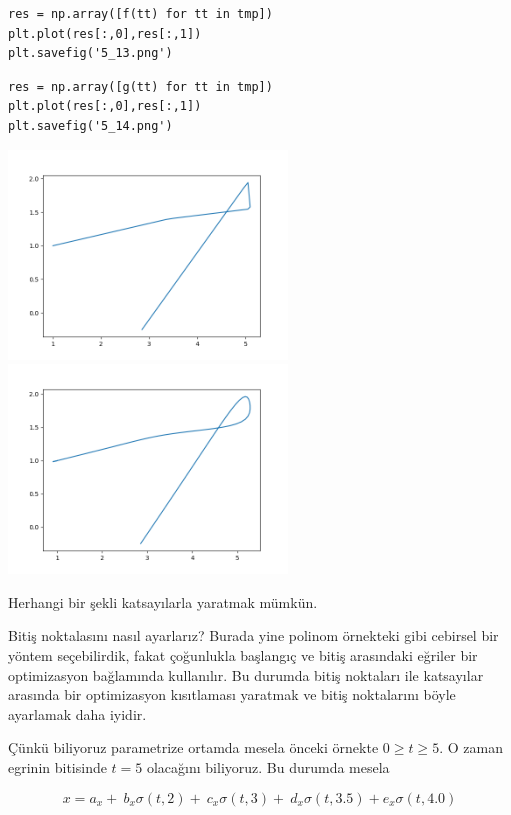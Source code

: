 \documentclass[12pt,fleqn]{article}\usepackage{../../common}
\begin{document}
\begin{verbatim}
res = np.array([f(tt) for tt in tmp])
plt.plot(res[:,0],res[:,1])
plt.savefig('5_13.png')
\end{verbatim}

\begin{verbatim}
res = np.array([g(tt) for tt in tmp])
plt.plot(res[:,0],res[:,1])
plt.savefig('5_14.png')
\end{verbatim}

\includegraphics[width=20em]{5_13.png}
\includegraphics[width=20em]{5_14.png}

Herhangi bir şekli katsayılarla yaratmak mümkün. 

Bitiş noktalasını nasıl ayarlarız? Burada yine polinom örnekteki gibi
cebirsel bir yöntem seçebilirdik, fakat çoğunlukla başlangıç ve bitiş
arasındaki eğriler bir optimizasyon bağlamında kullanılır. Bu durumda
bitiş noktaları ile katsayılar arasında bir optimizasyon kısıtlaması
yaratmak ve bitiş noktalarını böyle ayarlamak daha iyidir. 

Çünkü biliyoruz parametrize ortamda mesela önceki örnekte $0 \ge t \ge
5$. O zaman egrinin bitisinde $t=5$ olacağını biliyoruz. Bu durumda mesela 

$$
    x = a_x + \
        b_x \sigma(t,2) + \
        c_x \sigma(t,3) + \
        d_x \sigma(t,3.5) +
        e_x \sigma(t,4.0)
$$
\end{document}

